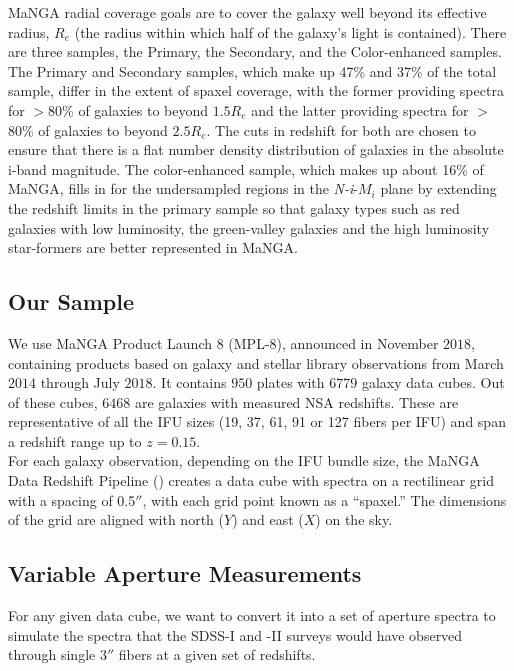 MaNGA radial coverage goals are to cover the galaxy 
well beyond its effective radius, $R_{e}$ (the radius 
within which half of the galaxy's light is contained). 
There are three samples, the Primary, the Secondary, 
and the Color-enhanced samples. The Primary and Secondary 
samples, which make up 47\% and 37\% of the total sample, 
differ in the extent of spaxel coverage, with the 
former providing spectra for $>$80\% of galaxies to 
beyond $1.5R_{e}$ and the latter providing spectra
for $>$80\% of galaxies to beyond $2.5R_{e}$.  
The cuts in redshift for both are chosen to ensure 
that there is a flat number density distribution of 
galaxies in the absolute i-band magnitude. The 
color-enhanced sample, which makes up about 16\% 
of MaNGA, fills in for the undersampled regions in 
the \emph{N-i}-$M_{i}$ plane by extending the 
redshift limits in the primary sample so that 
galaxy types such as red galaxies with low luminosity, 
the green-valley galaxies and the high luminosity 
star-formers are better represented in MaNGA.\\

\subsection{Our Sample}

We use MaNGA Product Launch 8 (MPL-$8$), 
announced in November $2018$, containing products 
based on galaxy and stellar library observations from 
March $2014$ through July $2018$.
It contains $950$ plates with $6779$ galaxy data cubes.
Out of these cubes, $6468$ are galaxies with measured 
NSA redshifts. These are representative of all the 
IFU sizes (19, 37, 61, 91 or 127 fibers per IFU) and 
span a redshift range up to $z = 0.15$.\\

For each galaxy observation, depending on the IFU 
bundle size, the MaNGA Data Redshift Pipeline 
(\citealt{law_data_2016}) creates a data cube with
spectra on a rectilinear grid with a spacing of 
0.5$''$, with each grid point known as a ``spaxel.'' 
The dimensions of the grid are aligned with north
($Y$) and east ($X$) on the sky.

\subsection{Variable Aperture Measurements}
\label{sec:chap2methods}
For any given data cube, we want to convert it into
a set of aperture spectra to 
simulate the spectra that the SDSS-I and -II
surveys would have observed through single 3$''$ fibers
at a given set of redshifts.

